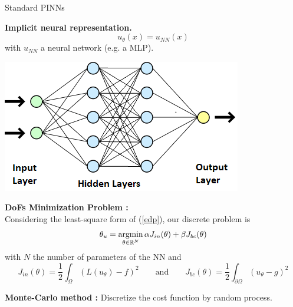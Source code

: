 \begin{frame}{Standard PINNs}
	\begin{minipage}{0.6\linewidth}
		\textbf{Implicit neural representation.}
		\begin{equation*}
			u_\theta(x)=u_{NN}(x)
		\end{equation*}
		with $u_{NN}$ a neural network (e.g. a MLP).
	\end{minipage}
	\begin{minipage}{0.36\linewidth}
		\includegraphics[width=0.95\linewidth]{images/learn_levelset/MLP_schema.png}
	\end{minipage}
	
	\vspace{5pt}
	
	\textbf{DoFs Minimization Problem :} \\
	Considering the least-square form of (\ref{edp}), our discrete problem is
	\begin{equation*}
		\displaystyle \theta_u=\argmin_{\theta\in\mathbb{R}^N} \alpha J_{in}(\theta)+\beta J_{bc}(\theta) %
	\end{equation*}
	with $N$ the number of parameters of the NN and
	\begin{equation*}
		J_{in}(\theta)=\frac{1}{2}\int_\Omega (L(u_\theta) - f)^2  \qquad \text{and} \qquad J_{bc}(\theta)=\frac{1}{2}\int_{\partial\Omega} (u_\theta-g)^2
	\end{equation*}	
	
	\textbf{Monte-Carlo method :} Discretize the cost function by random process.
\end{frame}

